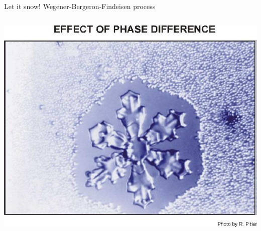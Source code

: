 \documentclass[xcolor=table]{beamer}
\begin{document}
\begin{frame}{Let it snow!}
	\hfill Wegener-\alert{Bergeron}-Findeisen \alert{process}
	\begin{columns}[b]
	\includegraphics[width=\textwidth,clip=true,trim=0 0 0 1cm]{Pitter1.jpg}
	

\end{columns}
\end{frame}
\end{document}
